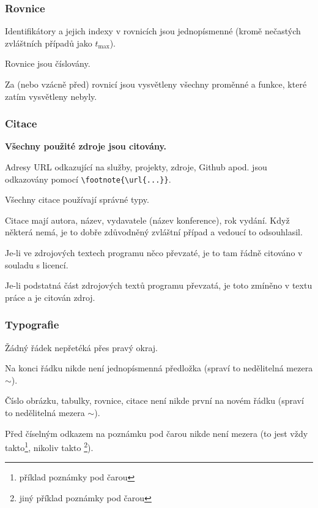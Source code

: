 \subsubsection*{Rovnice}
\begin{checklist}
	\item Identifikátory a jejich indexy v rovnicích jsou jednopísmenné (kromě nečastých zvláštních případů jako $t_\mathrm{max}$).
	\item Rovnice jsou číslovány.
	\item Za (nebo vzácně před) rovnicí jsou vysvětleny všechny proměnné a funkce, které zatím vysvětleny nebyly.
\end{checklist}

\subsubsection*{Citace}
\begin{checklist}
    \item \textbf{Všechny použité zdroje jsou citovány.}
	\item Adresy URL odkazující na služby, projekty, zdroje, Github apod. jsou odkazovány pomocí \verb|\footnote{\url{...}}|.
    \item Všechny citace používají správné typy.
	\item Citace mají autora, název, vydavatele (název konference), rok vydání.  Když některá nemá, je to dobře zdůvodněný zvláštní případ a vedoucí to odsouhlasil.
	\item Je-li ve zdrojových textech programu něco převzaté, je to tam řádně citováno v souladu s licencí.
	\item Je-li podstatná část zdrojových textů programu převzatá, je toto zmíněno v textu práce a je citován zdroj.
\end{checklist}

\subsubsection*{Typografie}
\begin{checklist}
	\item Žádný řádek nepřetéká přes pravý okraj.
	\item Na konci řádku nikde není jednopísmenná předložka (spraví to nedělitelná mezera $\sim$).
	\item Číslo obrázku, tabulky, rovnice, citace není nikde první na novém řádku (spraví to nedělitelná mezera $\sim$).
	\item Před číselným odkazem na poznámku pod čarou nikde není mezera (to jest vždy takto\footnote{příklad poznámky pod čarou}, nikoliv takto \footnote{jiný příklad poznámky pod čarou}).
\end{checklist}

